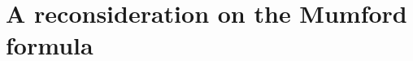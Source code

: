 \documentclass[12pt]{memoir}
\begin{document}
\section{A reconsideration on the Mumford formula}
\ifx\nextra\undefined
\printindex
\else\fi
\nocite{*}


\end{document}

